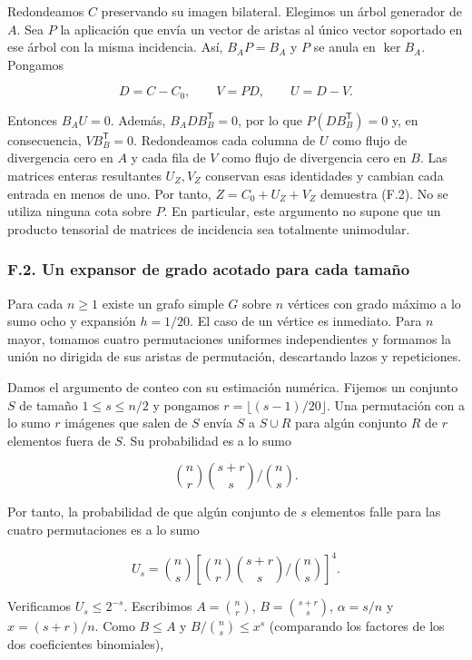 \documentclass[spanish,11pt,a4paper]{article}
\begin{document}
Redondeamos \(C\) preservando su imagen bilateral. Elegimos un árbol generador de \(A\). Sea \(P\) la aplicación que envía un vector de aristas al único vector soportado en ese árbol con la misma incidencia. Así, \(B_AP=B_A\) y \(P\) se anula en \(\ker B_A\). Pongamos

\[D=C-C_0,\qquad V=PD,\qquad U=D-V.\]

Entonces \(B_AU=0\). Además, \(B_A D B_B^{\mathsf T}=0\), por lo que \(P(DB_B^{\mathsf T})=0\) y, en consecuencia, \(VB_B^{\mathsf T}=0\). Redondeamos cada columna de \(U\) como flujo de divergencia cero en \(A\) y cada fila de \(V\) como flujo de divergencia cero en \(B\). Las matrices enteras resultantes \(U_{Z},V_{Z}\) conservan esas identidades y cambian cada entrada en menos de uno. Por tanto, \(Z=C_{0}+U_{Z}+V_{Z}\) demuestra (F.2). No se utiliza ninguna cota sobre \(P\). En particular, este argumento no supone que un producto tensorial de matrices de incidencia sea totalmente unimodular.

\subsubsection{F.2. Un expansor de grado acotado para cada tamaño}\label{f.2.-un-expansor-de-grado-acotado-para-cada-tamauxf1o}

Para cada \(n\ge 1\) existe un grafo simple \(G\) sobre \(n\) vértices con grado máximo a lo sumo ocho y expansión \(h=1/20\). El caso de un vértice es inmediato. Para \(n\) mayor, tomamos cuatro permutaciones uniformes independientes y formamos la unión no dirigida de sus aristas de permutación, descartando lazos y repeticiones.

Damos el argumento de conteo con su estimación numérica. Fijemos un conjunto \(S\) de tamaño \(1\le s\le n/2\) y pongamos \(r=\lfloor (s-1)/20\rfloor\). Una permutación con a lo sumo \(r\) imágenes que salen de \(S\) envía \(S\) a \(S\cup R\) para algún conjunto \(R\) de \(r\) elementos fuera de \(S\). Su probabilidad es a lo sumo

\[\binom nr\binom{s+r}s\big/\binom ns.\]

Por tanto, la probabilidad de que algún conjunto de \(s\) elementos falle para las cuatro permutaciones es a lo sumo

\[U_s=\binom ns\left[\binom nr\binom{s+r}s\big/\binom ns\right]^4.\]

Verificamos \(U_{s}\le 2^{-s}\). Escribimos \(A=\binom{n}{r}\), \(B=\binom{s+r}{s}\), \(\alpha=s/n\) y \(x=(s+r)/n\). Como \(B\le A\) y \(B/\binom{n}{s}\le x^{s}\) (comparando los factores de los dos coeficientes binomiales),
\end{document}
